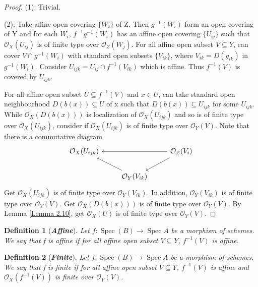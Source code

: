 \documentclass{ctexart}
\newtheorem{definition}{Definition}[section]
\newcommand{\spec}{\operatorname{Spec}}
\begin{document}
\begin{proof}
    (1): Trivial. 
    \par
    (2): Take affine open covering $\{W_{i}\}$ of Z.
    Then $g^{-1}(W_{i})$ form an open covering of Y and for each $W_{i}$, 
    $f^{-1}g^{-1}(W_{i})$ has an affine open covering $\{U_{ij}\}$ such that $\mathcal{O}_{X}(U_{ij})$ is of finite type over $\mathcal{O}_{Z}(W_{j})$.
    For all affine open subset $V \subseteq Y$, can cover $V \cap g^{-1}(W_{i})$ with standard open subsets $\{V_{ik}\}$, where $V_{ik} = D(g_{ik})$ in $g^{-1}(W_{i})$.
    Consider $U_{ijk} = U_{ij} \cap f^{-1}(V_{ik})$ which is affine.
    Thus $f^{-1}(V)$ is covered by $U_{ijk}$.
    \par
    For all affine open subset $U \subseteq f^{-1}(V)$ and $x\in U$, can take standard open neighbourhood $D(b(x)) \subseteq U$ of x such that $D(b(x)) \subseteq U_{ijk}$ for some $U_{ijk}$.
    While $\mathcal{O}_{X}(D(b(x)))$ is localization of $\mathcal{O}_{X}(U_{ijk})$ and so is of finite type over $\mathcal{O}_{X}(U_{ijk})$, consider if $\mathcal{O}_{X}(U_{ijk})$ is of finite type over $\mathcal{O}_{Y}(V)$.
    Note that there is a commutative diagram
    \begin{equation*}
        \begin{tikzcd}
            \mathcal{O}_{X}(U_{ijk}) &&
            \mathcal{O}_{Z}(V_{i}) \arrow[dl] \arrow[ll] \\
            & \mathcal{O}_{Y}(V_{ik}) \arrow[ul] &
        \end{tikzcd}
    \end{equation*}
    Get $\mathcal{O}_{X}(U_{ijk})$ is of finite type over $\mathcal{O}_{Y}(V_{ik})$.
    In addition, $\mathcal{O}_{Y}(V_{ik})$ is of finite type over $\mathcal{O}_{Y}(V)$.
    Get $\mathcal{O}_{X}(D(b(x)))$ is of finite type over $\mathcal{O}_{Y}(V)$.
    By Lemma \ref{Lemma 2.10}, get $\mathcal{O}_{X}(U)$ is of finite type over $\mathcal{O}_{Y}(V)$.
\end{proof}
\begin{definition}[\textbf{\emph{Affine}}]
    Let $f: \spec(B) \longrightarrow \spec A$ be a morphism of schemes.
    We say that f is affine if for all affine open subset $V \subseteq Y$,
    $f^{-1}(V)$ is affine.
\end{definition}
\begin{definition}[\textbf{\emph{Finite}}]
    Let $f: \spec(B) \longrightarrow \spec A$ be a morphism of schemes.
    We say that f is finite if for all affine open subset $V \subseteq Y$,
    $f^{-1}(V)$ is affine and $\mathcal{O}_{X}(f^{-1}(V))$ is finite over $\mathcal{O}_{Y}(V)$.
\end{definition}
\end{document}
